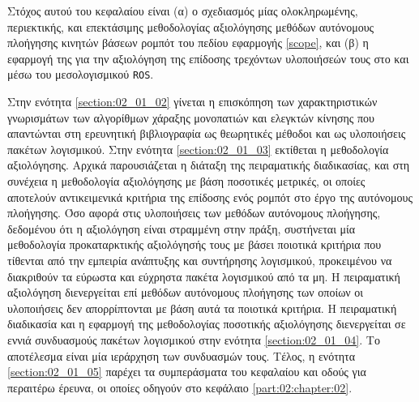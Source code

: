 Στόχος αυτού του κεφαλαίου είναι (α) ο σχεδιασμός μίας ολοκληρωμένης,
περιεκτικής, και επεκτάσιμης μεθοδολογίας αξιολόγησης μεθόδων αυτόνομους
πλοήγησης κινητών βάσεων ρομπότ του πεδίου εφαρμογής \ref{scope}, και (β) η
εφαρμογή της για την αξιολόγηση της επίδοσης τρεχόντων υλοποιήσεών τους στο και
μέσω του μεσολογισμικού \texttt{ROS}.

Στην ενότητα \ref{section:02_01_02} γίνεται η επισκόπηση των χαρακτηριστικών
γνωρισμάτων των αλγορίθμων χάραξης μονοπατιών και ελεγκτών κίνησης που
απαντώνται στη ερευνητική βιβλιογραφία ως θεωρητικές μέθοδοι και ως υλοποιήσεις
πακέτων λογισμικού. Στην ενότητα \ref{section:02_01_03} εκτίθεται η μεθοδολογία
αξιολόγησης. Αρχικά παρουσιάζεται η διάταξη της πειραματικής διαδικασίας, και
στη συνέχεια η μεθοδολογία αξιολόγησης με βάση ποσοτικές μετρικές, οι οποίες
αποτελούν αντικειμενικά κριτήρια της επίδοσης ενός ρομπότ στο έργο της
αυτόνομους πλοήγησης. Όσο αφορά στις υλοποιήσεις των μεθόδων αυτόνομους
πλοήγησης, δεδομένου ότι η αξιολόγηση είναι στραμμένη στην πράξη, συστήνεται
μία μεθοδολογία προκαταρκτικής αξιολόγησής τους με βάσει ποιοτικά κριτήρια που
τίθενται από την εμπειρία ανάπτυξης και συντήρησης λογισμικού, προκειμένου να
διακριθούν τα εύρωστα και εύχρηστα πακέτα λογισμικού από τα μη.  Η πειραματική
αξιολόγηση διενεργείται επί μεθόδων αυτόνομους πλοήγησης των οποίων οι
υλοποιήσεις δεν απορρίπτονται με βάση αυτά τα ποιοτικά κριτήρια. Η πειραματική
διαδικασία και η εφαρμογή της μεθοδολογίας ποσοτικής αξιολόγησης διενεργείται
σε εννιά συνδυασμούς πακέτων λογισμικού στην ενότητα \ref{section:02_01_04}. Το
αποτέλεσμα είναι μία ιεράρχηση των συνδυασμών τους.  Τέλος, η ενότητα
\ref{section:02_01_05} παρέχει τα συμπεράσματα του κεφαλαίου και οδούς για
περαιτέρω έρευνα, οι οποίες οδηγούν στο κεφάλαιο \ref{part:02:chapter:02}.
